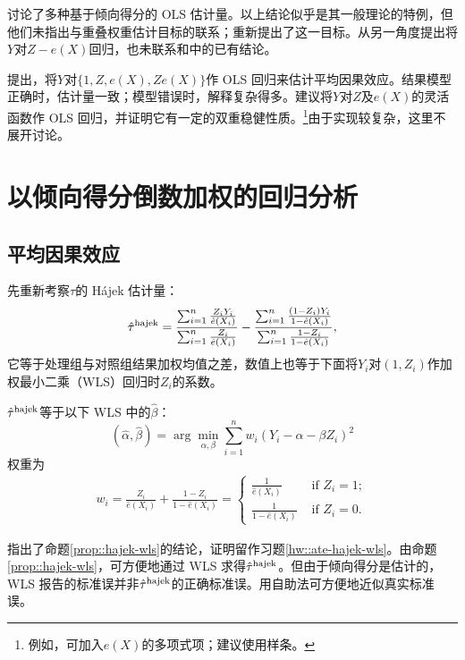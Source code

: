   
  
 
 
\citet{robins1992estimating}讨论了多种基于倾向得分的 OLS 估计量。以上结论似乎是其一般理论的特例，但他们未指出与重叠权重估计目标的联系；\citet{li2018balancing}重新提出了这一目标。\citet{lee2018simple}从另一角度提出将$Y$对$Z-e(X)$回归，也未联系\citet{robins1992estimating}和\citet{li2018balancing}中的已有结论。


\citet{rosenbaum1983central}提出，将$Y$对$\{1, Z, e(X), Ze(X)\}$作 OLS 回归来估计平均因果效应。结果模型正确时，估计量一致；模型错误时，解释复杂得多。\citet{little2004robust}建议将$Y$对$Z$及$e(X)$的灵活函数作 OLS 回归，并证明它有一定的双重稳健性质。\footnote{例如，可加入$e(X)$的多项式项；\citet{little2004robust}建议使用样条。}由于实现较复杂，这里不展开讨论。 



\section{以倾向得分倒数加权的回归分析} 


\subsection{平均因果效应}


先重新考察$\tau$的 Hájek 估计量：
$$
\hat{\tau}^\textup{hajek} = \frac{  \sum_{i=1}^n \frac{Z_i Y_i}{ \hat{e}(X_i) }  }{  \sum_{i=1}^n \frac{Z_i }{ \hat{e}(X_i) } }
- \frac{  \sum_{i=1}^n \frac{ (1-Z_i) Y_i}{ 1 - \hat{e}(X_i) }  }{  \sum_{i=1}^n \frac{ 1-Z_i}{ 1 - \hat{e}(X_i) }  },
$$
它等于处理组与对照组结果加权均值之差，数值上也等于下面将$Y_i$对$(1,Z_i)$作加权最小二乘（WLS）回归时$Z_i$的系数。


\begin{proposition}
\label{prop::hajek-wls}
$\hat{\tau}^\textup{hajek}$等于以下 WLS 中的$\hat{\beta}$：
$$
(\hat{\alpha}, \hat{\beta}) = \arg\min_{\alpha, \beta} \sum_{i=1}^n w_i(Y_i - \alpha - \beta Z_i)^2
$$
权重为
\begin{eqnarray}\label{eq::weight-hajek}
w_i =  \frac{Z_i}{   \hat{e}(X_i)  } + \frac{1-Z_i}{ 1-  \hat{e}(X_i) } 
= 
\begin{cases}
\frac{1}{\hat{e}(X_i) } & \text{ if } Z_i=1;\\
\frac{1}{ 1- \hat{e}(X_i) } & \text{ if } Z_i=0.
\end{cases} 
\end{eqnarray}
\end{proposition}

\citet{imbens2004nonparametric}指出了命题\ref{prop::hajek-wls}的结论，证明留作习题\ref{hw::ate-hajek-wls}。由命题\ref{prop::hajek-wls}，可方便地通过 WLS 求得$\hat{\tau}^\textup{hajek}$。但由于倾向得分是估计的，WLS 报告的标准误并非$\hat{\tau}^\textup{hajek}$的正确标准误。用自助法可方便地近似真实标准误。 

